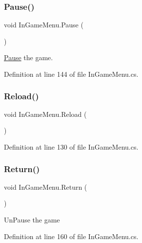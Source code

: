 \subsubsection{\texorpdfstring{Pause()}{Pause()}}
{\footnotesize\ttfamily void In\+Game\+Menu.\+Pause (\begin{DoxyParamCaption}{ }\end{DoxyParamCaption})}



\mbox{\hyperlink{class_pause}{Pause}} the game. 



Definition at line 144 of file In\+Game\+Menu.\+cs.

\mbox{\label{class_in_game_menu_a455c5f6f21a56dfad09d486273b9a8f2}} 
\subsubsection{\texorpdfstring{Reload()}{Reload()}}
{\footnotesize\ttfamily void In\+Game\+Menu.\+Reload (\begin{DoxyParamCaption}{ }\end{DoxyParamCaption})}



Definition at line 130 of file In\+Game\+Menu.\+cs.

\mbox{\label{class_in_game_menu_a7e379f478881365b7c2cb3c859e7d33c}} 
\subsubsection{\texorpdfstring{Return()}{Return()}}
{\footnotesize\ttfamily void In\+Game\+Menu.\+Return (\begin{DoxyParamCaption}{ }\end{DoxyParamCaption})}



Un\+Pause the game 



Definition at line 160 of file In\+Game\+Menu.\+cs.

\mbox{\label{class_in_game_menu_a700ab927248cf7c6095f9d7dccea007d}} 
